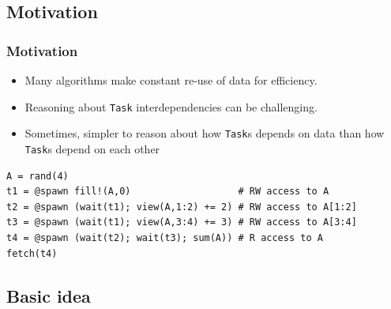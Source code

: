 \documentclass{beamer}
\begin{document}
\subsection{Motivation}

\begin{frame}[fragile]
\frametitle{Motivation}

\begin{itemize}
    \item Many algorithms make constant re-use of data for efficiency. 
    \item Reasoning about \texttt{Task} interdependencies can be challenging.
    \item Sometimes, simpler to reason about how \texttt{Task}s depends on data than how \texttt{Task}s depend on each other
\end{itemize}

\begin{example}
\begin{verbatim}    
A = rand(4)
t1 = @spawn fill!(A,0)                   # RW access to A
t2 = @spawn (wait(t1); view(A,1:2) += 2) # RW access to A[1:2]   
t3 = @spawn (wait(t1); view(A,3:4) += 3) # RW access to A[3:4]
t4 = @spawn (wait(t2); wait(t3); sum(A)) # R access to A
fetch(t4)
\end{verbatim}
\end{example}

\end{frame}

\subsection{Basic idea}
\end{document}
